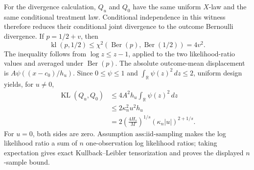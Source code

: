 For the divergence calculation, \(Q_u\) and \(Q_0\) have the same
uniform \(X\)-law and the same conditional treatment law.  Conditional
independence in this witness therefore reduces their conditional joint
divergence to the outcome Bernoulli divergence.  If \(p=1/2+v\), then
\[
 \operatorname{kl}(p,1/2)
 \le \chi^2(\operatorname{Ber}(p),\operatorname{Ber}(1/2))
 =4v^2.
\]
The inequality follows from \(\log z\le z-1\), applied to the two
likelihood-ratio values and averaged under \(\operatorname{Ber}(p)\).
The absolute outcome-mean displacement is
\(A\psi((x-c_0)/h_u)\).  Since \(0\le\psi\le1\) and
\(\int_{\mathbb R}\psi(z)^2\,dz\le2\), uniform design yields, for
\(u\ne0\),
\[
 \begin{aligned}
 \operatorname{KL}(Q_u,Q_0)
 &\le4A^2h_u\int_{\mathbb R}\psi(z)^2\,dz\\
 &\le2\kappa_n^2u^2h_u\\
 &=2\left(\frac{4H_s}{M}\right)^{1/s}
   (\kappa_n|u|)^{2+1/s}.
 \end{aligned}
\]
For \(u=0\), both sides are zero.  Assumption
\(\text{ass:iid-sampling}\) makes the log likelihood ratio a sum of
\(n\) one-observation log likelihood ratios; taking expectation gives
exact Kullback--Leibler tensorization and proves the displayed
\(n\)-sample bound.

